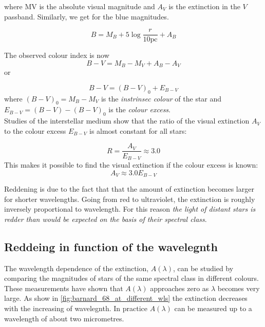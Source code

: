 \documentclass[a4paper,11pt,twoside]{book}
\begin{document}
where MV is the absolute visual magnitude and $A_V$ is the extinction in the $V$ passband. Similarly, we get for the blue magnitudes.

\begin{equation}
	B = M_B + 5 \log \frac{r}{10 \textrm{pc}}+ A_B
\end{equation}

The observed colour index is now
\begin{equation}
	B-V= M_B - M_V + A_B-A_V
\end{equation}
or

\begin{equation}
	B-V= (B - V)_0 + E_{B-V}
\end{equation}
where $(B-V)_0 = M_B - M_V $ is the \textit{instrinsec colour} of the star and $E_{B-V}=(B-V)-(B-V)_0$ is the \textit{colour excess}.\\

Studies of the interstellar medium show that the ratio of the visual extinction $A_V$ to the colour excess $E_{B-V}$ is almost
constant for all stars:

\begin{equation}
	R=\frac{A_V}{E_{B-V}} \approx 3.0
\end{equation}
This makes it possible to find the visual extinction
if the colour excess is known:
\begin{equation}
	A_V \approx 3.0 E_{B-V}
\end{equation}

Reddening is due to the fact that that the amount of extinction becomes larger for shorter wavelengths. Going from red to ultraviolet, the extinction is roughly inversely proportional to wavelength. For this reason \textit{the light of distant stars is redder than would be expected on
the basis of their spectral class}.

\subsection{Reddeing in function of the wavelegnth}
The wavelength dependence of the extinction, $A(\lambda)$, can be studied by comparing the magnitudes of stars of the same spectral class in different colours.\\

These measurements have shown that $A(\lambda)$ approaches zero as $\lambda$ becomes very large. As show in \ref{fig:barnard_68_at_different_wls} the extinction decreases with the increasing of wavelegnth. In practice $A(\lambda)$ can be measured up to a wavelength of about two micrometres.
\end{document}

